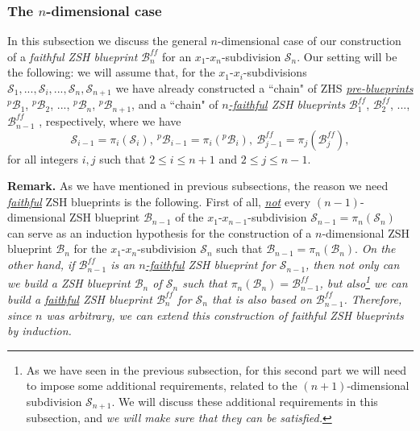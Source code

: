 \documentclass[12pt,letterpaper]{article}
\newtheorem{rem}[thm]{Remark}
\renewcommand{\S}{\mathcal{S}}
\newcommand{\B}{\mathcal{B}}
\begin{document}
\bigskip






\subsubsection{The $n$-dimensional case}

In this subsection we discuss the general $n$-dimensional case of our construction of a  {\em faithful ZSH blueprint} $\B_n^\mathit{ff}$ for an $x_1$-$x_n$-subdivision $\S_n$. Our setting will be the following: we will assume that, for the $x_1$-$x_i$-subdivisions $\S_1, ..., \S_i, ..., \S_n, \S_{n+1}$  we have already  constructed a ``chain" of ZHS \ul{\em pre-blueprints} 
$^p\!\B_1$, $^p\!\B_2$, ..., $^p\!\B_n$,  $^p\!\B_{n+1}$,  
and a ``chain" of {\em \ul{$n$-faithful} ZSH blueprints} 
$\B_1^\mathit{ff}$, $\B_2^\mathit{ff}$, ..., $\B_{n-1}^\mathit{ff}$  
, respectively, where we have 
$$
\S_{i-1} = \pi_i(\S_i), \ ^p\!\B_{i-1} = \pi_i(^p\!\B_i), \ \B_{j-1}^\mathit{ff} = \pi_j(\B_j^\mathit{ff}), 
$$
for all integers $i, j$ such that $2 \le i \le n+1$ and $2 \le j \le n-1$.





\bigskip


\noindent
{\bf Remark.}  As we have mentioned in previous subsections, the reason we need \ul{\em faithful}  ZSH blueprints is the following. 
First of all, \ul{\em not} every $(n-1)$-dimensional ZSH blueprint $\B_{n-1}$ of the $x_1$-$x_{n-1}$-subdivision $\S_{n-1} = \pi_n(\S_n)$ can serve as an induction hypothesis for the construction of a $n$-dimensional ZSH blueprint $\B_n$ for the $x_1$-$x_n$-subdivision $\S_n$ such that $\B_{n-1} = \pi_n(\B_n)$. 
{\em 
On the other hand, if $\B_{n-1}^\mathit{ff}$ is an  \ul{$n$-faithful} ZSH blueprint for $\S_{n-1}$, then not only can we build a ZSH blueprint $\B_n$ of $\S_n$ such that  $\pi_n(\B_n) = \B_{n-1}^\mathit{ff}$, but also\footnote{As we have seen in the previous subsection, for this second part we will need  to impose some additional requirements, related to the $(n+1)$-dimensional subdivision $\S_{n+1}$. We will discuss  these additional requirements in this subsection, and {\em we will make sure that they can  be satisfied.}} we can build a \ul{\em faithful}  ZSH blueprint  $\B_n^\mathit{ff}$ for $\S_n$ that is also based on $\B_{n-1}^\mathit{ff}$. Therefore, since $n$ was arbitrary, we can  extend this construction of {\em faithful}  ZSH blueprints  by induction. 
}
\end{document}
